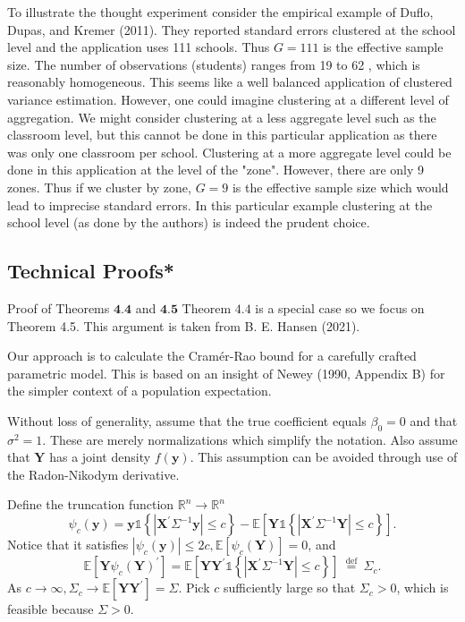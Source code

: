 \documentclass[10pt]{article}
\begin{document}
To illustrate the thought experiment consider the empirical example of Duflo, Dupas, and Kremer (2011). They reported standard errors clustered at the school level and the application uses 111 schools. Thus $G=111$ is the effective sample size. The number of observations (students) ranges from 19 to 62 , which is reasonably homogeneous. This seems like a well balanced application of clustered variance estimation. However, one could imagine clustering at a different level of aggregation. We might consider clustering at a less aggregate level such as the classroom level, but this cannot be done in this particular application as there was only one classroom per school. Clustering at a more aggregate level could be done in this application at the level of the "zone". However, there are only 9 zones. Thus if we cluster by zone, $G=9$ is the effective sample size which would lead to imprecise standard errors. In this particular example clustering at the school level (as done by the authors) is indeed the prudent choice.

\subsection{Technical Proofs*}
Proof of Theorems $\mathbf{4 . 4}$ and $\mathbf{4 . 5}$ Theorem $4.4$ is a special case so we focus on Theorem 4.5. This argument is taken from B. E. Hansen (2021).

Our approach is to calculate the Cramér-Rao bound for a carefully crafted parametric model. This is based on an insight of Newey (1990, Appendix B) for the simpler context of a population expectation.

Without loss of generality, assume that the true coefficient equals $\beta_{0}=0$ and that $\sigma^{2}=1$. These are merely normalizations which simplify the notation. Also assume that $\boldsymbol{Y}$ has a joint density $f(\boldsymbol{y})$. This assumption can be avoided through use of the Radon-Nikodym derivative.

Define the truncation function $\mathbb{R}^{n} \rightarrow \mathbb{R}^{n}$
$$
\psi_{c}(\boldsymbol{y})=\boldsymbol{y} \mathbb{1}\left\{\left|\boldsymbol{X}^{\prime} \Sigma^{-1} \boldsymbol{y}\right| \leq c\right\}-\mathbb{E}\left[\boldsymbol{Y} \mathbb{1}\left\{\left|\boldsymbol{X}^{\prime} \Sigma^{-1} \boldsymbol{Y}\right| \leq c\right\}\right] .
$$
Notice that it satisfies $\left|\psi_{c}(\boldsymbol{y})\right| \leq 2 c, \mathbb{E}\left[\psi_{c}(\boldsymbol{Y})\right]=0$, and
$$
\mathbb{E}\left[\boldsymbol{Y} \psi_{c}(\boldsymbol{Y})^{\prime}\right]=\mathbb{E}\left[\boldsymbol{Y} \boldsymbol{Y}^{\prime} \mathbb{1}\left\{\left|\boldsymbol{X}^{\prime} \Sigma^{-1} \boldsymbol{Y}\right| \leq c\right\}\right] \stackrel{\text { def }}{=} \Sigma_{c} .
$$
As $c \rightarrow \infty, \Sigma_{c} \rightarrow \mathbb{E}\left[\boldsymbol{Y} \boldsymbol{Y}^{\prime}\right]=\Sigma$. Pick $c$ sufficiently large so that $\Sigma_{c}>0$, which is feasible because $\Sigma>0$.
\end{document}
